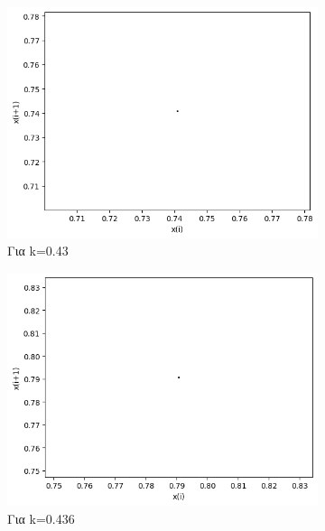 \begin{figure}[h!]
	\centering
	\caption{Διαγράμματα της τιμής \(x_i\) με την τιμή \(x_{i+1}\) :}
	\begin{subfigure}[b]{0.25\textwidth}
		\centering
		\includegraphics[width=\textwidth]{LateX images/graphs q09/g3}
		\caption{Για k=0.43}
		\label{f:k48}
	\end{subfigure}
	\hfill
	\begin{subfigure}[b]{0.25\textwidth}
		\centering
		\includegraphics[width=\textwidth]{LateX images/graphs q09/g4}
		\caption{Για k=0.436}
		\label{f:k49}
	\end{subfigure}
	\hfill
	\begin{subfigure}[b]{0.25\textwidth}
		\centering

\end{subfigure}
\end{figure}
